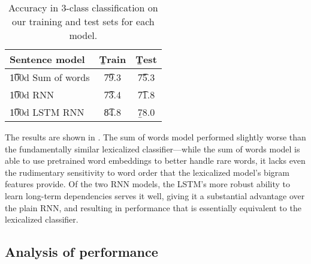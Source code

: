 \begin{table}
\begin{center}
\begin{tabular}{l@{\hskip \colspaceL}@{\hskip \colspaceL}c@{\hskip \colspaceL}c}
\toprule
\textbf{Sentence model} & \b{Train}  & \b{Test}\\
\midrule
\t{100d Sum of words}            & \t{79.3} & \t{75.3} \\

\t{100d RNN}            & \t{73.4} & \t{71.8} \\	

\t{100d LSTM RNN}            & \t{84.8} & \b{78.0} \\

\bottomrule
\end{tabular}
\end{center}
\caption{
\label{tab:nnresults}
Accuracy in 3-class classification on our training and test sets for each model.
}
\end{table}

The results are shown in . The sum of words model performed slightly worse than the fundamentally similar lexicalized classifier---while the sum of words model is able to use pretrained word embeddings to better handle rare words, it lacks even the rudimentary sensitivity to word order that the lexicalized model's bigram features provide. Of the two RNN models, the LSTM's more robust ability to learn long-term dependencies serves it well, giving it a substantial advantage over the plain RNN, and  resulting in performance that is essentially equivalent to the lexicalized classifier.

\subsection{Analysis of performance}

